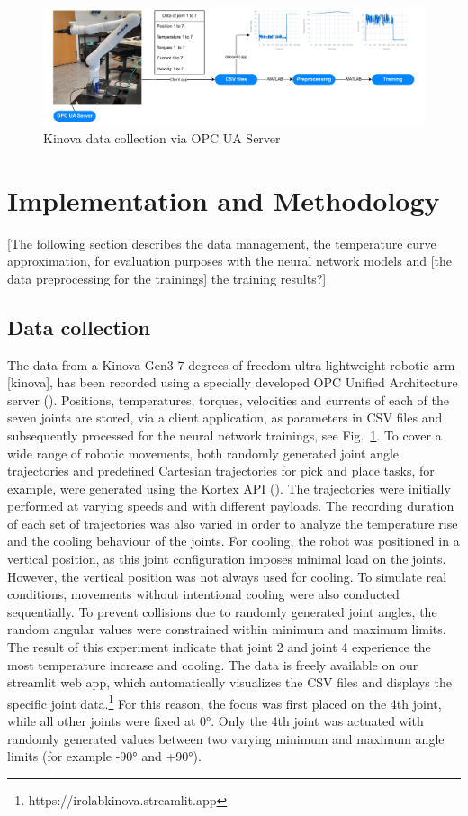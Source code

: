 \documentclass{ifacconf}
\begin{document}
\begin{figure}
  \begin{center}
    \includegraphics[width=\textwidth]{pictures/DataAquisition.drawio.pdf} 
    \caption{Kinova data collection via OPC UA Server} 
    \label{fig:DataAquisition}
  \end{center}
\end{figure}
\section{Implementation and Methodology}
[The following section describes the data management, the temperature curve approximation, for evaluation purposes with the neural network models 
and [the data preprocessing for the trainings] the training results?]

\subsection{Data collection}
The data from a Kinova Gen3 7 degrees-of-freedom ultra-lightweight robotic arm [kinova], has been recorded using a specially developed OPC Unified Architecture server (\cite{Girke}). 
Positions, temperatures, torques, velocities and currents of each of the seven joints are stored, via a client application, as parameters in CSV files and subsequently processed for the neural network trainings, see Fig.~\ref{fig:DataAquisition}.
To cover a wide range of robotic movements, both randomly generated joint angle trajectories and predefined Cartesian trajectories for pick and place tasks, for example, were generated using the Kortex API (\cite{kortexAPI}). 
The trajectories were initially performed at varying speeds and with different payloads. The recording duration of each set of trajectories was also varied in order to analyze the temperature rise and the cooling behaviour of the joints. 
For cooling, the robot was positioned in a vertical position, as this joint configuration imposes minimal load on the joints. However, the vertical position was not always used for cooling. To simulate real conditions, movements without intentional cooling were also conducted sequentially.
To prevent collisions due to randomly generated joint angles, the random angular values were constrained within minimum and maximum limits. 
The result of this experiment indicate that joint 2 and joint 4 experience the most temperature increase and cooling. The data is freely available on our streamlit web app, 
which automatically visualizes the CSV files and displays the specific joint data.\footnote{https://irolabkinova.streamlit.app}  
For this reason, the focus was first placed on the 4th joint, while all other joints were fixed at 0°. Only the 4th joint was actuated with randomly generated values between two varying minimum and maximum angle limits (for example -90° and +90°).
\end{document}

